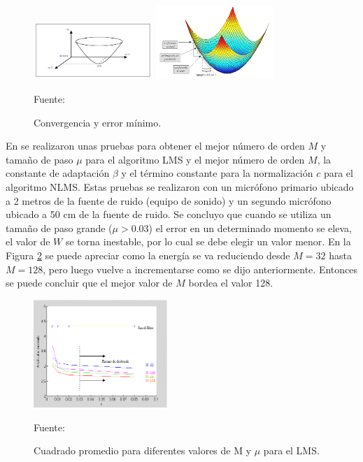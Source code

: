 \begin{enumerate}
\begin{enumerate}
\begin{figure}[ht]
\begin{center}
\includegraphics[width=0.4\textwidth]{Imagenes/Cap2/image020}
\includegraphics[width=0.4\textwidth]{Imagenes/Cap2/image021}
\end{center}
\begin{center}
\vskip -0.5cm
\caption{\small{Convergencia y error mínimo.}}
\label{fig:figura2.20}
{\small{Fuente: \cite{simon}}}
\end{center}
\end{figure}

En \citep{simon} se realizaron unas pruebas para obtener el mejor número de orden $M$ y tamaño de paso $\mu$ para el algoritmo LMS y el mejor número de orden $M$, la constante de adaptación $\beta$ y el término constante para la normalización $c$ para el algoritmo NLMS. Estas pruebas se realizaron con un micrófono primario ubicado a 2 metros de la fuente de ruido (equipo de sonido) y un segundo micrófono ubicado a 50 cm de la fuente de ruido. Se concluyo que cuando se utiliza un tamaño de paso grande ($\mu > 0.03$) el error en un determinado momento se eleva, el valor de $W$ se torna inestable, por lo cual se debe elegir un valor menor. 
\vskip 0.5cm
En la Figura \ref{fig:figura2.21} se puede apreciar como la energía se va reduciendo desde $M=32$ hasta $M=128$, pero luego vuelve a incrementarse como se dijo anteriormente. Entonces se puede concluir que el mejor valor de $M$ bordea el valor 128.
\newpage
\begin{figure}[ht]
\begin{center}
\includegraphics[width=0.45\textwidth]{Imagenes/Cap2/image022}
\end{center}
\begin{center}
\vskip -0.5cm
\caption{\small{Cuadrado promedio para diferentes valores de M y $\mu$ para el LMS.}}
\label{fig:figura2.21}
{\small{Fuente: \cite{simon}}}
\end{center}
\end{figure}


\end{enumerate}
\end{enumerate}
